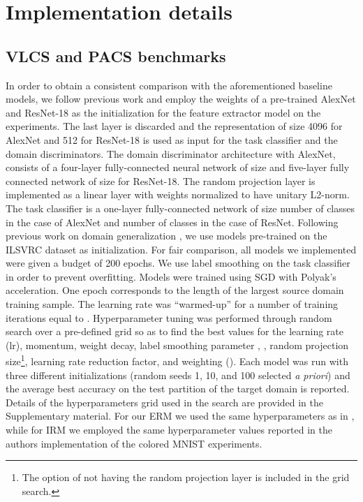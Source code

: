 \documentclass{article}
\begin{document}
\section{Implementation details}
\subsection{VLCS and PACS benchmarks}
In order to obtain a consistent comparison with the aforementioned baseline models, we follow previous work and employ the weights of a pre-trained AlexNet \cite{krizhevsky2012imagenet} and ResNet-18 \cite{he2016deep}  as the initialization for the feature extractor model on the experiments. \iffalse  with both benchmarks \fi The last layer is discarded and the representation of size 4096 for AlexNet and 512 for ResNet-18 is used as input for the task classifier and the domain discriminators. The domain discriminator architecture with AlexNet, consists of a four-layer fully-connected neural network of size  and five-layer fully connected network of size  for ResNet-18. The random projection layer is implemented as a linear layer with weights normalized to have unitary L2-norm. The task classifier is a one-layer fully-connected network of size  number of classes in the case of AlexNet and  number of classes in the case of ResNet.
Following previous work on domain generalization \cite{li2017deeper, li2019episodic}, we use models pre-trained on the ILSVRC dataset \cite{ILSVRC15} as initialization. For fair comparison, all models we implemented were given a budget of 200 epochs. We use label smoothing \cite{szegedy2016rethinking} on the task classifier in order to prevent overfitting. Models were trained using SGD with Polyak's acceleration. One epoch corresponds to the length of the largest source domain training sample. The learning rate was ``warmed-up'' for a number of training iterations equal to . Hyperparameter tuning was performed through random search over a pre-defined grid so as to find the best values for the learning rate (lr), momentum, weight decay, label smoothing parameter , , random projection size\footnote{The option of not having the random projection layer is included in the grid search.},
learning rate reduction factor, and weighting (). Each model was run with three different initializations (random seeds 1, 10, and 100 selected \textit{a priori}) and the average best accuracy on the test partition of the target domain is reported. Details of the hyperparameters grid used in the search are provided in the Supplementary material. For our ERM we used the same hyperparameters as in \cite{carlucci2019domain}, while for IRM we employed the same hyperparameter values reported in the authors implementation of the colored MNIST experiments.
\end{document}
